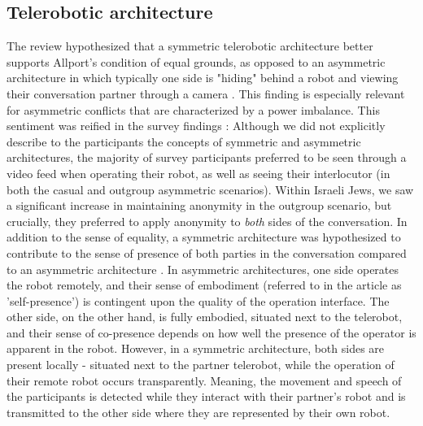 \documentclass[dissertation,math,vertlayout,pdfa,colorlinks,nologo]{aaltoseries}
\begin{document}
\subsection{Telerobotic architecture}
The review hypothesized that a symmetric telerobotic architecture better supports Allport's condition of equal grounds, as opposed to an asymmetric architecture in which typically one side is "hiding" behind a robot and viewing their conversation partner through a camera \cite[p. 78]{peledTelerobotContactHypothesis2022}. This finding is especially relevant for asymmetric conflicts that are characterized by a power imbalance. This sentiment was reified in the survey findings \cite[p. 11]{peledTeleroboticIntergroupContact2024}: Although we did not explicitly describe to the participants the concepts of symmetric and asymmetric architectures, the majority of survey participants preferred to be seen through a video feed when operating their robot, as well as seeing their interlocutor (in both the casual and outgroup asymmetric scenarios). Within Israeli Jews, we saw a significant increase in maintaining anonymity in the outgroup scenario, but crucially, they preferred to apply anonymity to \textit{both} sides of the conversation. In addition to the sense of equality, a symmetric architecture was hypothesized to contribute to the sense of presence of both parties in the conversation compared to an asymmetric architecture \cite[p. 78]{peledTeleroboticIntergroupContact2024}. In asymmetric architectures, one side operates the robot remotely, and their sense of embodiment (referred to in the article as 'self-presence') is contingent upon the quality of the operation interface. The other side, on the other hand, is fully embodied, situated next to the telerobot, and their sense of co-presence depends on how well the presence of the operator is apparent in the robot. However, in a symmetric architecture, both sides are present locally - situated next to the partner telerobot, while the operation of their remote robot occurs transparently. Meaning, the movement and speech of the participants is detected while they interact with their partner's robot and is transmitted to the other side where they are represented by their own robot.
\end{document}
